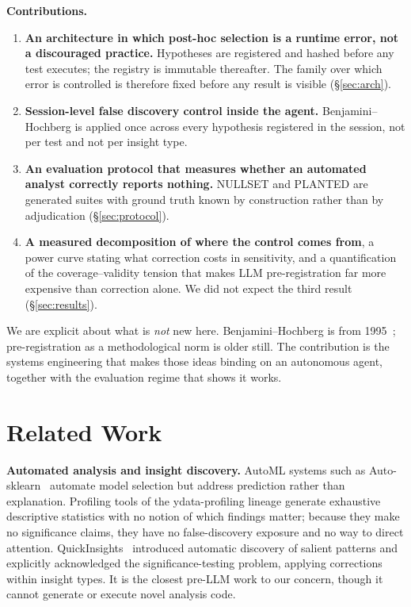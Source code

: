 \documentclass[10pt,twocolumn]{article}
\newcommand{\phead}[1]{\smallskip\noindent\textbf{#1.}\hspace{0.6em}\ignorespaces}
\begin{document}
\phead{Contributions}
\begin{enumerate}\itemsep1pt
\item \textbf{An architecture in which post-hoc selection is a runtime error,
not a discouraged practice.} Hypotheses are registered and hashed before any
test executes; the registry is immutable thereafter. The family over which
error is controlled is therefore fixed before any result is visible
(\S\ref{sec:arch}).

\item \textbf{Session-level false discovery control inside the agent.}
Benjamini--Hochberg is applied once across every hypothesis registered in the
session, not per test and not per insight type.

\item \textbf{An evaluation protocol that measures whether an automated analyst
correctly reports nothing.} NULLSET and PLANTED are generated suites with
ground truth known by construction rather than by adjudication
(\S\ref{sec:protocol}).

\item \textbf{A measured decomposition of where the control comes from}, a power
curve stating what correction costs in sensitivity, and a quantification of the
coverage--validity tension that makes LLM pre-registration far more expensive
than correction alone. We did not expect the third result (\S\ref{sec:results}).
\end{enumerate}

We are explicit about what is \emph{not} new here. Benjamini--Hochberg is from
1995~\cite{benjamini1995}; pre-registration as a methodological norm is older
still. The contribution is the systems engineering that makes those ideas
binding on an autonomous agent, together with the evaluation regime that shows
it works.

\section{Related Work}

\phead{Automated analysis and insight discovery}
AutoML systems such as Auto-sklearn~\cite{feurer2015} automate model selection
but address prediction rather than explanation. Profiling tools of the
ydata-profiling lineage generate exhaustive descriptive statistics with no
notion of which findings matter; because they make no significance claims, they
have no false-discovery exposure and no way to direct attention.
QuickInsights~\cite{ding2019} introduced automatic discovery of salient patterns
and explicitly acknowledged the significance-testing problem, applying
corrections within insight types. It is the closest pre-LLM work to our concern,
though it cannot generate or execute novel analysis code.
\end{document}
